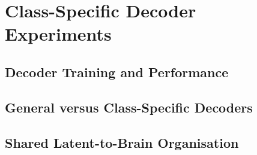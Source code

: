 \section{Class-Specific Decoder Experiments}
\subsection{Decoder Training and Performance}
\subsection{General versus Class-Specific Decoders}
\subsection{Shared Latent-to-Brain Organisation}

